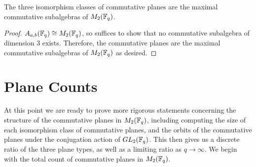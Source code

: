 \documentclass{amsart}
\begin{document}
\begin{cor}
    The three isomorphism classes of commutative planes are the maximal commutative subalgebras of $M_2(\protect\mathbb{F}_q)$.
\end{cor}
\begin{proof}
    $A_{a,b}(\protect\mathbb{F}_q) \cong M_2(\protect\mathbb{F}_q)$, so  suffices to show that no commutative subalgebra of dimension 3 exists. Therefore, the commutative planes are the maximal commutative subalgebras of $M_2(\protect\mathbb{F}_q)$ as desired.
\end{proof}





\section{Plane Counts}

At this point we are ready to prove more rigorous statements concerning the structure of the commutative planes in $M_2(\protect\mathbb{F}_q)$, including computing the size of each isomorphism class of commutative planes, and the orbits of the commutative planes under the conjugation action of $GL_2(\protect\mathbb{F}_q)$. This then gives us a discrete ratio of the three plane types, as well as a limiting ratio as $q \rightarrow \infty$. We begin with the total count of commutative planes in $M_2(\protect\mathbb{F}_q)$. 
\end{document}
